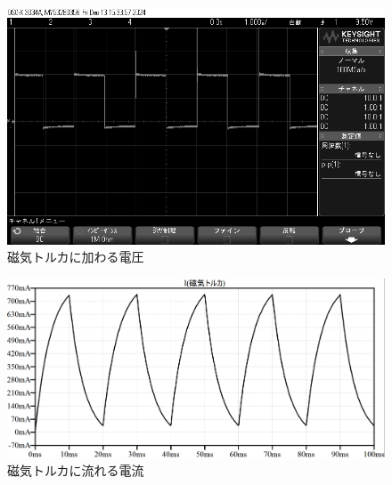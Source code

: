 \begin{figure}[H]
	\centering
		\includegraphics[scale=0.3]{./figure/scope_11.png}
		\caption{磁気トルカに加わる電圧}
		\label{fig:osiro2}
\end{figure}

\begin{figure}[H]
	\centering
		\includegraphics[scale=0.25]{./figure/50current.png}
		\caption{磁気トルカに流れる電流}
		\label{fig:current50}
\end{figure}

